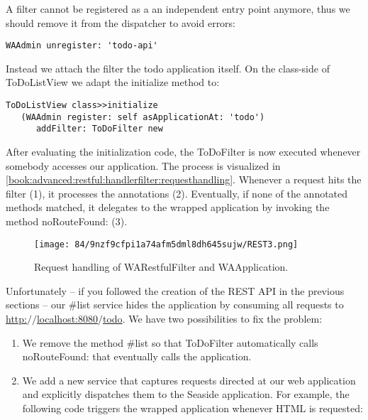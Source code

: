 \documentclass[a4paper,10pt,twoside]{book}
\newcommand{\ct}[1]{{\small\ttfamily\textup{#1}}}
\begin{document}
A filter cannot be registered as a an independent entry point anymore, thus we should remove it from the dispatcher to avoid errors:

\begin{lstlisting}
WAAdmin unregister: 'todo-api'
\end{lstlisting}

Instead we attach the filter the todo application itself. On the class-side of \ct{ToDoListView} we adapt the \ct{initialize} method to:

\begin{lstlisting}
ToDoListView class>>initialize
   (WAAdmin register: self asApplicationAt: 'todo')
      addFilter: ToDoFilter new
\end{lstlisting}

After evaluating the initialization code, the \ct{ToDoFilter} is now executed whenever somebody accesses our application. The process is visualized in \autoref{book:advanced:restful:handlerfilter:requesthandling}. Whenever a request hits the filter (1), it processes the annotations (2). Eventually, if none of the annotated methods matched, it delegates to the wrapped application by invoking the method noRouteFound: (3). 

\begin{figure}[h!tbp]
	\begin{center}
		\texttt{[image: 84/9nzf9cfpi1a74afm5dml8dh645sujw/REST3.png]}
		\caption{Request handling of WARestfulFilter and WAApplication.\label{book:advanced:restful:handlerfilter:requesthandling}}
	\end{center}
\end{figure}


Unfortunately -- if you followed the creation of the REST API in the previous sections -- our \ct{\#list} service hides the application by consuming all requests to \href{http://localhost:8080/todo}{http:$/$$/$localhost:8080$/$todo}. We have two possibilities to fix the problem:

\begin{enumerate}
\item  We remove the method \ct{\#list} so that \ct{ToDoFilter} automatically calls \ct{noRouteFound:} that eventually calls the application.
\item  We add a new service that captures requests directed at our web application and explicitly dispatches them to the Seaside application. For example, the following code triggers the wrapped application whenever HTML is requested:
\end{enumerate}
\end{document}
